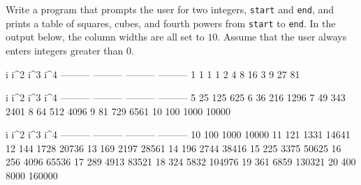 Write a program that prompts the user for two integers, \verb!start! and
\verb!end!, and prints a table of squares, cubes, and fourth powers from
\verb!start! to \verb!end!. In the output below, the column widths are all set
to $10$. Assume that the user always enters integers greater than 0.

\resett
\nextt
\begin{console}[commandchars=\\\{\}]
         i       i^2       i^3       i^4
 --------- --------- --------- ---------
         1         1         1         1
         2         4         8        16
         3         9        27        81
\end{console}

\nextt
\begin{console}[commandchars=\\\{\}]
         i       i^2       i^3       i^4
 --------- --------- --------- ---------
         5        25       125       625
         6        36       216      1296
         7        49       343      2401
         8        64       512      4096
         9        81       729      6561
        10       100      1000     10000
\end{console}

\nextt
\begin{console}[commandchars=\\\{\}]
         i       i^2       i^3       i^4
 --------- --------- --------- ---------
        10       100      1000     10000
        11       121      1331     14641
        12       144      1728     20736
        13       169      2197     28561
        14       196      2744     38416
        15       225      3375     50625
        16       256      4096     65536
        17       289      4913     83521
        18       324      5832    104976
        19       361      6859    130321
        20       400      8000    160000
\end{console}
